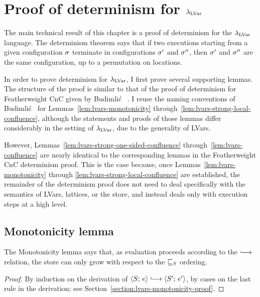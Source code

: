 \section{Proof of determinism for
  $\lambda_{\textrm{LVar}}$}\label{s:lvars-proof}

The main technical result of this chapter is a proof of determinism
for the $\lambda_{\textrm{LVar}}$ language.  The determinism theorem says that if
two executions starting from a given configuration $\sigma$ terminate
in configurations $\sigma'$ and $\sigma''$, then $\sigma'$ and $\sigma''$
are the same configuration, up to a permutation on locations.

In order to prove determinism for $\lambda_{\textrm{LVar}}$, I first prove several
supporting lemmas.  The structure of the proof is similar to that of
the proof of determinism for Featherweight CnC given by Budimli\'c
\etal~\cite{CnC}.  I reuse the naming conventions of Budimli\'c
\etal~for Lemmas~\ref{lem:lvars-monotonicity}
through~\ref{lem:lvars-strong-local-confluence}, although the
statements and proofs of those lemmas differ considerably in the
setting of $\lambda_{\textrm{LVar}}$, due to the generality of LVars.

However, Lemmas~\ref{lem:lvars-strong-one-sided-confluence}
through~\ref{lem:lvars-confluence} are nearly identical to the
corresponding lemmas in the Featherweight CnC determinism proof.  This
is the case because, once Lemmas~\ref{lem:lvars-monotonicity} through
\ref{lem:lvars-strong-local-confluence} are established, the remainder
of the determinism proof does not need to deal specifically with the
semantics of LVars, lattices, or the store, and instead deals only
with execution steps at a high level.


\subsection{Monotonicity lemma}

The Monotonicity lemma says that, as evaluation proceeds according to
the $\parstepsto$ relation, the store can only grow with respect to
the $ \sqsubseteq_S $ ordering.

\LVarsLemMonotonicity
\begin{proof}
  By induction on the derivation of $\config{S}{e} \parstepsto
  \config{S'}{e'}$, by cases on the last rule in the derivation; see
  Section~\ref{section:lvars-monotonicity-proof}.
\end{proof}

